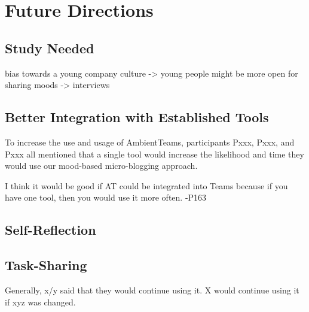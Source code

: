 \chapter{Future Directions}
\label{chapter:future_directions}

\section{Study Needed}
bias towards a young company culture -> young people might be more open for sharing moods -> interviews


\section{Better Integration with Established Tools}
To increase the use and usage of AmbientTeams, participants Pxxx, Pxxx, and Pxxx all mentioned that a single tool would increase the likelihood and time they would use our mood-based micro-blogging approach.

\begin{displayquote}
    I think it would be good if AT could be integrated into Teams because if you have one tool, then you would use it more often. -P163
\end{displayquote}

\section{Self-Reflection}

\section{Task-Sharing}


Generally, x/y said that they would continue using it. X would continue using it if xyz was changed.